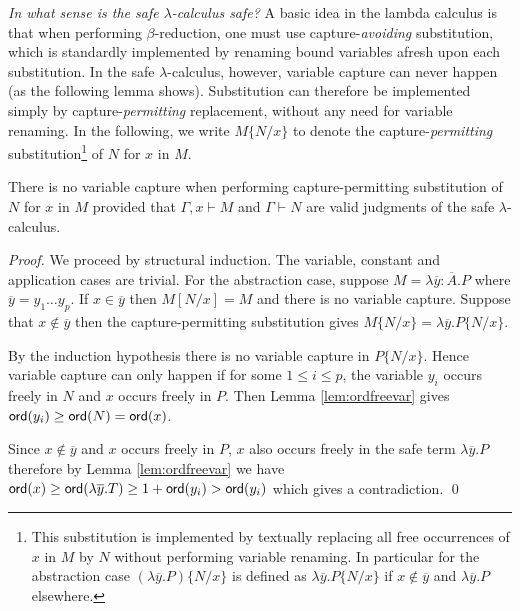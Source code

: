 \documentclass{llncs}
\newcommand\subst[2]{\left[ #1/#2 \right]}
\newcommand\captsubst[2]{\{#1/#2 \}}
\begin{document}
\emph{In what sense is the safe $\lambda$-calculus safe?} A basic idea
in the lambda calculus is that when performing $\beta$-reduction, one
must use capture-\emph{avoiding} substitution, which is standardly
implemented by renaming bound variables afresh upon each substitution.
In the safe $\lambda$-calculus, however, variable capture can never
happen (as the following lemma shows). Substitution can therefore be
implemented simply by capture-\emph{permitting} replacement, without
any need for variable renaming. In the following, we write
$M\captsubst{N}{x}$ to denote the capture-\emph{permitting}
substitution\footnote{This substitution is implemented by textually
  replacing all free occurrences of $x$ in $M$ by $N$ without
  performing variable renaming.  In particular for the abstraction
  case $(\lambda \overline{y} . P)\captsubst{N}{x}$ is defined as
  $\lambda \overline{y} . P\captsubst{N}{x}$ if $x\not\in
  \overline{y}$ and $\lambda \overline{y} . P$ elsewhere.} of $N$ for
$x$ in $M$.

\begin{lemma}
\label{lem:homog_nocapture} There is
no variable capture when performing capture-permitting
substitution of $N$ for $x$ in $M$
provided that $\Gamma, x \vdash M$ and $\Gamma \vdash  N$ are valid judgments of the safe $\lambda$-calculus.
\end{lemma}

\begin{proof}
  We proceed by structural induction. The variable, constant and
  application cases are trivial. For the abstraction case, suppose $M
  = \lambda \overline{y} : \overline{A}. P$ where $\overline{y} = y_1
  \ldots y_p$. If $x \in \overline{y}$ then $M \subst{N}{x} = M$ and
  there is no variable capture.  Suppose that $x \not\in \overline{y}$
  then the capture-permitting substitution gives $M \captsubst{N}{x} =
  \lambda \overline{y} . P \captsubst{N}{x}$.

  By the induction hypothesis there is no variable capture in $P
  \captsubst{N}{x}$.  Hence variable capture can only happen if for
  some $1 \leq i \leq p$, the variable $y_i$ occurs freely in $N$ and
  $x$ occurs freely in $P$. Then Lemma \ref{lem:ordfreevar} gives $
  {\sf ord}(y_i) \geq {\sf ord}(N) = {\sf ord}(x)$.

  Since $x \not \in \overline{y}$ and $x$ occurs freely in $P$, $x$
  also occurs freely in the safe term $\lambda \overline{y}. P$
  therefore by Lemma \ref{lem:ordfreevar} we have $ {\sf ord}(x) \geq
  {\sf ord}(\lambda \overline{y} . T) \geq 1+ {\sf ord}(y_i) > {\sf ord}(y_i)$ which
  gives a contradiction. \qed
\end{proof}
\end{document}
